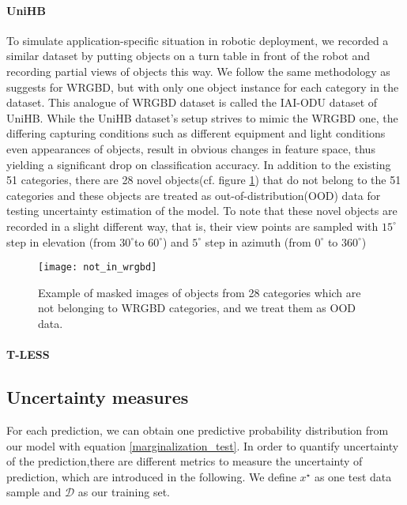 \paragraph{UniHB} To simulate application-specific situation in robotic deployment, we recorded a similar dataset by putting objects on a turn table in front of the robot and recording partial views of objects this way. We follow the same methodology as \cite{lai2011large} suggests for WRGBD, but with only one object instance for each category in the dataset. This analogue of WRGBD dataset is called the IAI-ODU dataset of UniHB. While the UniHB dataset's setup strives to mimic the WRGBD one, the differing capturing conditions such as different equipment and light conditions even appearances of objects, result in obvious changes in feature space, thus yielding a significant drop on classification accuracy. In addition to the existing 51 categories, there are 28 novel objects(cf. figure \ref{fig:not_in_wrgbd}) that do not belong to the 51 categories and these objects are treated as out-of-distribution(OOD) data for testing uncertainty estimation of the model. To note that these novel objects are recorded in a slight different way, that is, their view points are sampled with $15^{\circ}$ step in elevation (from $30^{\circ}$to $60^{\circ}$) and $5^\circ$ step in azimuth (from $0^\circ$ to $360^\circ$)

\begin{figure}[h!]
	\begin{center}
		\texttt{[image: not\_in\_wrgbd]}
		\caption{Example of masked images of objects from 28 categories which are not belonging to WRGBD categories, and we treat them as OOD data.}		
		\label{fig:not_in_wrgbd}
	\end{center}
\end{figure}
\paragraph{T-LESS\cite{hodan2017tless}}


\subsection{Uncertainty measures}
For each prediction, we can obtain one predictive probability distribution from our model with equation \ref{marginalization_test}. In order to quantify uncertainty of the prediction,there are different metrics to measure the uncertainty of prediction, which are introduced in the following. We define $x^\star$ as one test data sample and $\mathcal D$ as our training set. 
